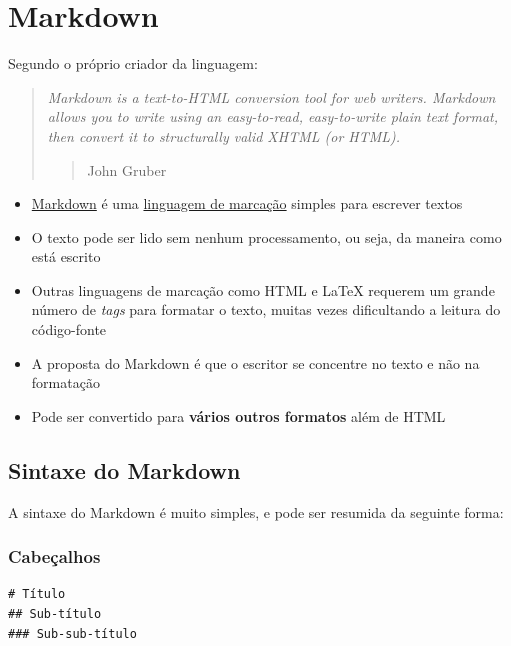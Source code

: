 \documentclass[10pt,a4paper]{book}
\providecommand{\tightlist}{%
  \setlength{\itemsep}{0pt}\setlength{\parskip}{0pt}}
\begin{document}
\section{Markdown}\label{markdown}

Segundo o próprio criador da linguagem:

\begin{quote}
\emph{Markdown is a text-to-HTML conversion tool for web writers.
Markdown allows you to write using an easy-to-read, easy-to-write plain
text format, then convert it to structurally valid XHTML (or HTML).}

\begin{quote}
John Gruber
\end{quote}
\end{quote}

\begin{itemize}
\tightlist
\item
  \href{http://daringfireball.net/projects/markdown}{Markdown} é uma
  \href{https://pt.wikipedia.org/wiki/Linguagem_de_marcação/}{linguagem
  de marcação} simples para escrever textos
\item
  O texto pode ser lido sem nenhum processamento, ou seja, da maneira
  como está escrito
\item
  Outras linguagens de marcação como HTML e LaTeX requerem um grande
  número de \emph{tags} para formatar o texto, muitas vezes dificultando
  a leitura do código-fonte
\item
  A proposta do Markdown é que o escritor se concentre no texto e não na
  formatação
\item
  Pode ser convertido para \textbf{vários outros formatos} além de HTML
\end{itemize}

\subsection{Sintaxe do Markdown}\label{sintaxe-do-markdown}

A sintaxe do Markdown é muito simples, e pode ser resumida da seguinte
forma:

\subsubsection*{Cabeçalhos}\label{cabeuxe7alhos}


\begin{verbatim}
# Título
## Sub-título
### Sub-sub-título
\end{verbatim}
\end{document}

